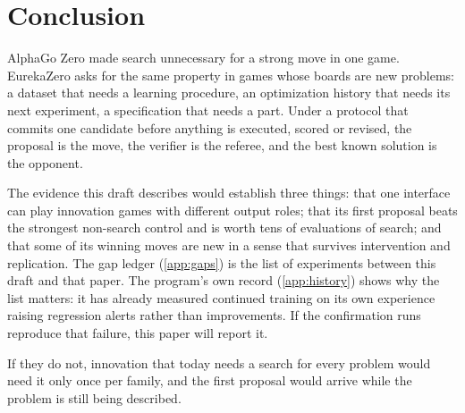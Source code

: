 \section{Conclusion}
\label{sec:conclusion}

AlphaGo Zero made search unnecessary for a strong move in one game. EurekaZero asks for the same
property in games whose boards are new problems: a dataset that needs a learning procedure, an
optimization history that needs its next experiment, a specification that needs a part. Under a
protocol that commits one candidate before anything is executed, scored or revised, the proposal is
the move, the verifier is the referee, and the best known solution is the opponent.

The evidence this draft describes would establish three things: that one interface can play
innovation games with different output roles; that its first proposal beats the strongest
non-search control and is worth tens of evaluations of search; and that some of its winning moves are
new in a sense that survives intervention and replication. The gap ledger (\cref{app:gaps}) is the
list of experiments between this draft and that paper. The program's own record (\cref{app:history})
shows why the list matters: it has already measured continued training on its own experience raising
regression alerts rather than improvements. If the confirmation runs reproduce that failure, this paper will report it.

If they do not, innovation that today needs a search for every problem would need it only once per
family, and the first proposal would arrive while the problem is still being described.
